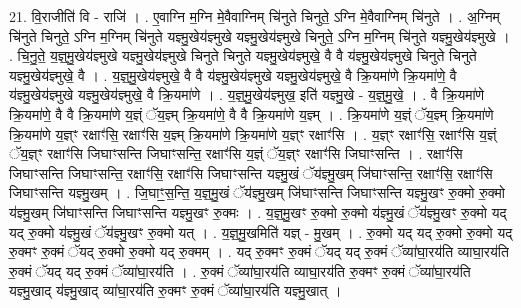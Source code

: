 \documentclass[17pt]{extarticle}
\begin{document}
21. वि॒राजीति॑ वि - राजि॑ । . ए॒वाग्नि म॒ग्नि मे॒वैवाग्निम् चि॑नुते चिनुते॒ ऽग्नि मे॒वैवाग्निम् चि॑नुते । . अ॒ग्निम् चि॑नुते चिनुते॒ ऽग्नि म॒ग्निम् चि॑नुते यज्ञ्मु॒खेय॑ज्ञ्मुखे यज्ञ्मु॒खेय॑ज्ञ्मुखे चिनुते॒ ऽग्नि म॒ग्निम् चि॑नुते यज्ञ्मु॒खेय॑ज्ञ्मुखे । . चि॒नु॒ते॒ य॒ज्ञ्॒मु॒खेय॑ज्ञ्मुखे यज्ञ्मु॒खेय॑ज्ञ्मुखे चिनुते चिनुते यज्ञ्मु॒खेय॑ज्ञ्मुखे॒ वै वै य॑ज्ञ्मु॒खेय॑ज्ञ्मुखे चिनुते चिनुते यज्ञ्मु॒खेय॑ज्ञ्मुखे॒ वै । . य॒ज्ञ्॒मु॒खेय॑ज्ञ्मुखे॒ वै वै य॑ज्ञ्मु॒खेय॑ज्ञ्मुखे यज्ञ्मु॒खेय॑ज्ञ्मुखे॒ वै क्रि॒यमा॑णे क्रि॒यमा॑णे॒ वै य॑ज्ञ्मु॒खेय॑ज्ञ्मुखे यज्ञ्मु॒खेय॑ज्ञ्मुखे॒ वै क्रि॒यमा॑णे । . य॒ज्ञ्॒मु॒खेय॑ज्ञ्मुख॒ इति॑ यज्ञ्मु॒खे - य॒ज्ञ्॒मु॒खे॒ । . वै क्रि॒यमा॑णे क्रि॒यमा॑णे॒ वै वै क्रि॒यमा॑णे य॒ज्ञ्ं ॅय॒ज्ञ्म् क्रि॒यमा॑णे॒ वै वै क्रि॒यमा॑णे य॒ज्ञ्म् । . क्रि॒यमा॑णे य॒ज्ञ्ं ॅय॒ज्ञ्म् क्रि॒यमा॑णे क्रि॒यमा॑णे य॒ज्ञ्ꣳ रक्षाꣳ॑सि॒ रक्षाꣳ॑सि य॒ज्ञ्म् क्रि॒यमा॑णे क्रि॒यमा॑णे य॒ज्ञ्ꣳ रक्षाꣳ॑सि । . य॒ज्ञ्ꣳ रक्षाꣳ॑सि॒ रक्षाꣳ॑सि य॒ज्ञ्ं ॅय॒ज्ञ्ꣳ रक्षाꣳ॑सि जिघाꣳसन्ति जिघाꣳसन्ति॒ रक्षाꣳ॑सि य॒ज्ञ्ं ॅय॒ज्ञ्ꣳ रक्षाꣳ॑सि जिघाꣳसन्ति । . रक्षाꣳ॑सि जिघाꣳसन्ति जिघाꣳसन्ति॒ रक्षाꣳ॑सि॒ रक्षाꣳ॑सि जिघाꣳसन्ति यज्ञ्मु॒खं ॅय॑ज्ञ्मु॒खम् जि॑घाꣳसन्ति॒ रक्षाꣳ॑सि॒ रक्षाꣳ॑सि जिघाꣳसन्ति यज्ञ्मु॒खम् । . जि॒घाꣳ॒॒स॒न्ति॒ य॒ज्ञ्॒मु॒खं ॅय॑ज्ञ्मु॒खम् जि॑घाꣳसन्ति जिघाꣳसन्ति यज्ञ्मु॒खꣳ रु॒क्मो रु॒क्मो य॑ज्ञ्मु॒खम् जि॑घाꣳसन्ति जिघाꣳसन्ति यज्ञ्मु॒खꣳ रु॒क्मः । . य॒ज्ञ्॒मु॒खꣳ रु॒क्मो रु॒क्मो य॑ज्ञ्मु॒खं ॅय॑ज्ञ्मु॒खꣳ रु॒क्मो यद् यद् रु॒क्मो य॑ज्ञ्मु॒खं ॅय॑ज्ञ्मु॒खꣳ रु॒क्मो यत् । . य॒ज्ञ्॒मु॒खमिति॑ यज्ञ् - मु॒खम् । . रु॒क्मो यद् यद् रु॒क्मो रु॒क्मो यद् रु॒क्मꣳ रु॒क्मं ॅयद् रु॒क्मो रु॒क्मो यद् रु॒क्मम् । . यद् रु॒क्मꣳ रु॒क्मं ॅयद् यद् रु॒क्मं ॅव्या॑घा॒रय॑ति व्याघा॒रय॑ति रु॒क्मं ॅयद् यद् रु॒क्मं ॅव्या॑घा॒रय॑ति । . रु॒क्मं ॅव्या॑घा॒रय॑ति व्याघा॒रय॑ति रु॒क्मꣳ रु॒क्मं ॅव्या॑घा॒रय॑ति यज्ञ्मु॒खाद् य॑ज्ञ्मु॒खाद् व्या॑घा॒रय॑ति रु॒क्मꣳ रु॒क्मं ॅव्या॑घा॒रय॑ति यज्ञ्मु॒खात् । \newline
\end{document}
